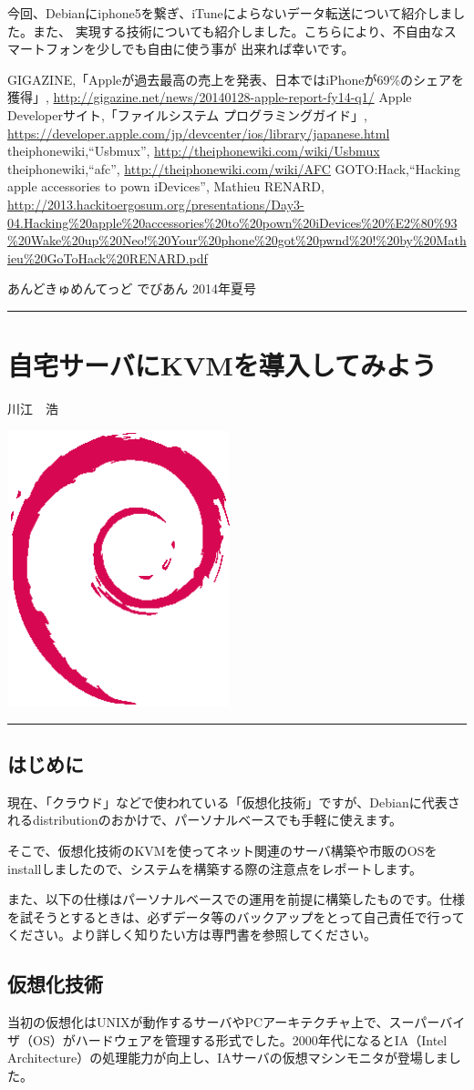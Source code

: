 \documentclass[mingoth,a4paper]{jsarticle}
\renewcommand{\dancersection}[2]{%
\newpage
あんどきゅめんてっど でびあん 2014年夏号
%
\vspace{0.1mm}\\
{\color{dancerdarkblue}\rule{\hsize}{2mm}}

%
%
\begin{minipage}[t]{0.6\hsize}
\color{dancerdarkblue}
\vspace{1cm}
\section{#1}
\hfill{}#2\\
\end{minipage}
\begin{minipage}[t]{0.4\hsize}
\vspace{-2cm}
\hfill{}\includegraphics[height=8cm]{image200502/openlogo-nd.eps}\\
\vspace{-5cm}
\end{minipage}
%
{\color{dancerlightblue}\rule{0.66\hsize}{2mm}}
%
\vspace{2cm}
}
\begin{document}
 今回、Debianにiphone5を繋ぎ、iTuneによらないデータ転送について紹介しました。また、
実現する技術についても紹介しました。こちらにより、不自由なスマートフォンを少しでも自由に使う事が
出来れば幸いです。

\begin{thebibliography}{0}
    {\footnotesize{
       GIGAZINE,「Appleが過去最高の売上を発表、日本ではiPhoneが69\%のシェアを獲得」,
       \url{http://gigazine.net/news/20140128-apple-report-fy14-q1/}}}
    {\footnotesize{
       Apple Developerサイト,「ファイルシステム プログラミングガイド」,
       \url{https://developer.apple.com/jp/devcenter/ios/library/japanese.html}}}
    {\footnotesize{
       theiphonewiki,``Usbmux'',
       \url{http://theiphonewiki.com/wiki/Usbmux}}}
    {\footnotesize{
       theiphonewiki,``afc'',
       \url{http://theiphonewiki.com/wiki/AFC}}}
    {\footnotesize{
       GOTO:Hack,``Hacking apple accessories to pown iDevices'', Mathieu RENARD,
       \url{http://2013.hackitoergosum.org/presentations/Day3-04.Hacking%20apple%20accessories%20to%20pown%20iDevices%20%E2%80%93%20Wake%20up%20Neo!%20Your%20phone%20got%20pwnd%20!%20by%20Mathieu%20GoToHack%20RENARD.pdf}}}
\end{thebibliography}

\dancersection{自宅サーバにKVMを導入してみよう}{川江　浩}

\subsection{はじめに}
現在、「クラウド」などで使われている「仮想化技術」ですが、Debianに代表されるdistributionのおかけで、パーソナルベースでも手軽に使えます。

そこで、仮想化技術のKVMを使ってネット関連のサーバ構築や市販のOSをinstallしましたので、システムを構築する際の注意点をレポートします。

また、以下の仕様はパーソナルベースでの運用を前提に構築したものです。仕様を試そうとするときは、必ずデータ等のバックアップをとって自己責任で行ってください。より詳しく知りたい方は専門書を参照してください。

\subsection{仮想化技術}
当初の仮想化はUNIXが動作するサーバやPCアーキテクチャ上で、スーパーバイザ（OS）がハードウェアを管理する形式でした。2000年代になるとIA（Intel Architecture）の処理能力が向上し、IAサーバの仮想マシンモニタが登場しました。
\end{document}
